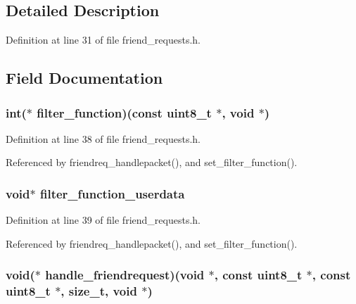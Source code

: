 \subsection{Detailed Description}


Definition at line 31 of file friend\+\_\+requests.\+h.



\subsection{Field Documentation}
\hypertarget{struct_friend___requests_a09cd55683f2075e72518e94efbcba2d5}{
\subsubsection[{filter\+\_\+function}]{\setlength{\rightskip}{0pt plus 5cm}int($\ast$ filter\+\_\+function)(const uint8\+\_\+t $\ast$, void $\ast$)}}\label{struct_friend___requests_a09cd55683f2075e72518e94efbcba2d5}


Definition at line 38 of file friend\+\_\+requests.\+h.



Referenced by friendreq\+\_\+handlepacket(), and set\+\_\+filter\+\_\+function().

\hypertarget{struct_friend___requests_a52b17bf891c29cd0309d69ddf5be7e5e}{
\subsubsection[{filter\+\_\+function\+\_\+userdata}]{\setlength{\rightskip}{0pt plus 5cm}void$\ast$ filter\+\_\+function\+\_\+userdata}}\label{struct_friend___requests_a52b17bf891c29cd0309d69ddf5be7e5e}


Definition at line 39 of file friend\+\_\+requests.\+h.



Referenced by friendreq\+\_\+handlepacket(), and set\+\_\+filter\+\_\+function().

\hypertarget{struct_friend___requests_a9d869a78e35e2af8312a3bec21dc7d0c}{
\subsubsection[{handle\+\_\+friendrequest}]{\setlength{\rightskip}{0pt plus 5cm}void($\ast$ handle\+\_\+friendrequest)(void $\ast$, const uint8\+\_\+t $\ast$, const uint8\+\_\+t $\ast$, size\+\_\+t, void $\ast$)}}\label{struct_friend___requests_a9d869a78e35e2af8312a3bec21dc7d0c}



